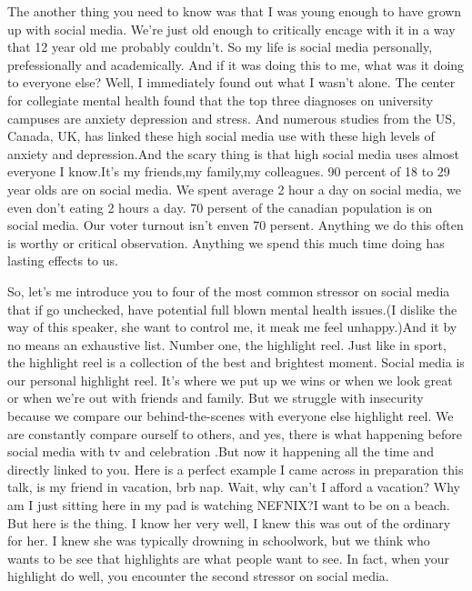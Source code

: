 \documentclass[UTF8,12pt,a4paper]{article}
\theoremstyle{Problem}
\theoremstyle{Solution}
\begin{document}
\begin{appendix}
    The another thing you need to know was that I was young enough to have grown up with social media. We're just old enough to critically encage with it in a way that 12 year old me probably couldn't. So my life is  social media personally, prefessionally and academically. And if it was doing this to me, what was it doing to everyone else? Well, I immediately found out what I wasn't alone. The center for collegiate mental health found that the top three diagnoses on university campuses are anxiety depression and stress. And numerous studies from the US, Canada,  UK, has linked these high social media use with these high levels of anxiety and depression.And the scary thing is that high social media uses almost everyone I know.It's my friends,my family,my colleagues. 90 percent of 18 to 29 year olds are on social media. We spent average 2 hour a day on social media, we even don't eating 2 hours a day. 70 persent of the canadian population is on social media. Our voter turnout isn't enven 70 persent. Anything we do this often is worthy or critical observation. Anything we spend this much time doing has lasting effects to us. 
    
    So, let's me introduce you to four of the most common stressor on social media that if go unchecked, have potential full blown mental health issues.(I dislike the way of this speaker, she want to control me, it meak me feel unhappy.)And it by no means an exhaustive list. Number one, the highlight reel. Just like in sport, the highlight reel is a collection of the best and brightest moment. Social media is our personal highlight reel. It's where we put up we wins or when we look great or when we're out with friends and family. But we struggle with insecurity because we compare our behind-the-scenes with everyone else highlight reel. We are constantly compare ourself to others, and yes, there is what happening before social media with tv and celebration .But now it happening all the time and directly linked to you. Here is a perfect example I came across in preparation this talk, is my friend in vacation, brb nap. Wait, why can't I afford a vacation? Why am I just sitting here in my pad is watching NEFNIX?I want to be on a beach. But here is the thing. I know her very well, I knew this was out of the ordinary for her. I knew she was typically drowning in schoolwork, but we think who wants to be see that highlights are what people want to see. In fact, when your highlight do well, you encounter the second stressor on social media. 
    

\end{appendix}
\end{document}
